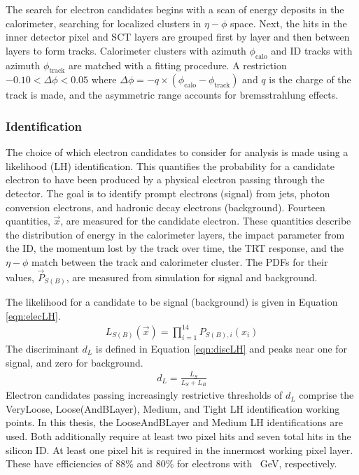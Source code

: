 The search for electron candidates begins with a scan of energy deposits in the calorimeter, searching for localized clusters in $\eta-\phi$ space.
Next, the hits in the inner detector pixel and SCT layers are grouped first by layer and then between layers to form tracks.
Calorimeter clusters with azimuth $\phi_\text{calo}$ and ID tracks with azimuth $\phi_\text{track}$ are matched with a fitting procedure.
A restriction $-0.10<\Delta\phi<0.05$ where $\Delta\phi=-q\times(\phi_\text{calo}-\phi_\text{track})$ and $q$ is the charge of the track is made, and the asymmetric range accounts for bremsstrahlung effects. \cite{elecReco}

\subsubsection{Identification}

The choice of which electron candidates to consider for analysis is made using a likelihood (LH) identification.
This quantifies the probability for a candidate electron to have been produced by a physical electron passing through the detector.
The goal is to identify prompt electrons (signal) from jets, photon conversion electrons, and hadronic decay electrons (background).
Fourteen quantities, $\vec{x}$, are measured for the candidate electron.
These quantities describe the distribution of energy in the calorimeter layers, the impact parameter from the ID, the momentum lost by the track over time, the TRT response, and the $\eta-\phi$ match between the track and calorimeter cluster.
The PDFs for their values, $\vec{P}_{S(B)}$, are measured from simulation for signal and background.

The likelihood for a candidate to be signal (background) is given in Equation \ref{eqn:elecLH}.
\begin{equation}\begin{split}\label{eqn:elecLH}
L_{S(B)}(\vec{x}) = \prod_{i=1}^{14}P_{S(B),i}(x_i)
\end{split}\end{equation}
The discriminant $d_L$ is defined in Equation \ref{eqn:discLH} and peaks near one for signal, and zero for background.
\begin{equation}\begin{split}\label{eqn:discLH}
d_L=\frac{L_S}{L_S+L_B}
\end{split}\end{equation} 
Electron candidates passing increasingly restrictive thresholds of $d_L$ comprise the VeryLoose, Loose(AndBLayer), Medium, and Tight LH identification working points.
In this thesis, the LooseAndBLayer and Medium LH identifications are used.
Both additionally require at least two pixel hits and seven total hits in the silicon ID.
At least one pixel hit is required in the innermost working pixel layer.
These have efficiencies of 88\% and 80\% for electrons with ~GeV, respectively.


